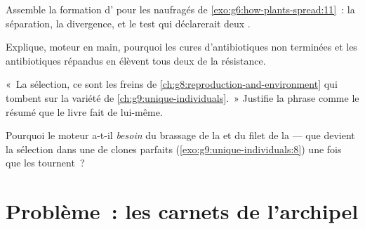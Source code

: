 \begin{exercise}[$\star\star$]\label{exo:g9:how-species-change:9}
Assemble la formation d' pour les naufragés de
\cref{exo:g6:how-plants-spread:11}~: la séparation, la
divergence, et le test qui déclarerait deux .
\end{exercise}

\begin{exercise}[$\star\star$]\label{exo:g9:how-species-change:10}
Explique, moteur en main, pourquoi les cures
d'antibiotiques non terminées et les antibiotiques répandus
en  élèvent tous deux de la résistance.
\end{exercise}

\begin{exercise}[$\star\star$]\label{exo:g9:how-species-change:11}
«~La sélection, ce sont les freins de
\cref{ch:g8:reproduction-and-environment} qui tombent sur
la variété de \cref{ch:g9:unique-individuals}.~» Justifie
la phrase comme le résumé que le livre fait de lui-même.
\end{exercise}

\begin{exercise}[$\star\star\star$]\label{exo:g9:how-species-change:12}
Pourquoi le moteur a-t-il \emph{besoin} du brassage de la
 et du filet de la  --- que
devient la sélection dans une  de clones parfaits
(\cref{exo:g9:unique-individuals:8}) une fois que les
 tournent~?
\end{exercise}

\section{Problème~: les carnets de l'archipel}

